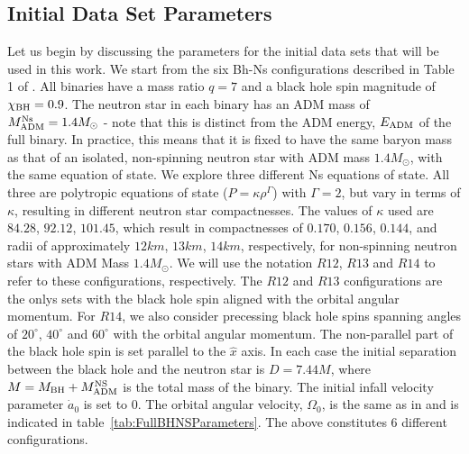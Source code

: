 \subsection{Initial Data Set Parameters}
Let us begin by discussing the parameters for the initial data sets
that will be used in this work. We start from the six Bh-Ns
configurations described in Table 1 of \cite{Foucart:2013a}. All
binaries have a mass ratio $q=7$ and a black hole spin magnitude of
$\chi_{\rm BH}=0.9$. The neutron star in each binary has
an ADM mass of $M^{\rm Ns}_{\rm ADM}=1.4M_{\odot}$ - note that this is
distinct from the ADM energy, $E_{\rm ADM}$ of the full binary. In
practice, this means that it is fixed to have the same baryon mass as
that of an isolated, non-spinning neutron star with ADM mass
$1.4M_{\odot}$, with the same equation of state. We explore three
different Ns equations of state. All three are polytropic equations of
state ($P=\kappa\rho^\Gamma$) with $\Gamma=2$, but vary in terms of
$\kappa$, resulting in different neutron star compactnesses. The
values of $\kappa$ used are $84.28$, $92.12$, $101.45$, which result
in compactnesses of $0.170$, $0.156$, $0.144$, and radii of
approximately $12km$, $13km$, $14km$, respectively, for non-spinning
neutron stars with ADM Mass $1.4M_{\odot}$. We will use the notation
$R12$, $R13$ and $R14$ to refer to these configurations,
respectively. The $R12$ and $R13$ configurations are the onlys sets
with the black hole spin aligned with the orbital angular
momentum. For $R14$, we also consider precessing
black hole spins spanning angles of $20^{\circ}$, $40^{\circ}$ and
$60^{\circ}$ with the orbital angular momentum. The non-parallel part of the black hole spin is set
parallel to the $\hat{x}$ axis. In each case the initial separation
between the black hole and the neutron star is $D=7.44M$, where
$M=M_{\rm BH}+M_{\rm ADM}^{\rm NS}$ is the total mass of the
binary. The initial infall velocity parameter $\dot{a}_0$ is set to
$0$. The orbital angular velocity, $\Omega_0$, is the same as in \cite{Foucart:2013a} and is indicated in table~\ref{tab:FullBHNSParameters}.
The above constitutes 6 different configurations. 

